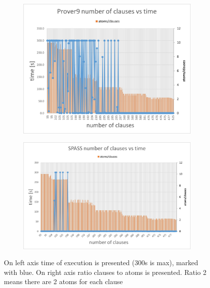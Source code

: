 \begin{figure}[ht]
\centering
  \begin{subfigure}{0.9\textwidth}
\centering
  \includegraphics[width=\textwidth]{logic-formula-generator/dataset_analysis/cnf charts/01 Prover9 number of clauses vs time.jpg}
  \label{pic:benchmark_results}
  \end{subfigure}

  \begin{subfigure}{\textwidth}
\centering
  \includegraphics[width=\textwidth]{logic-formula-generator/dataset_analysis/cnf charts/11 SPASS number of clauses vs time.jpg}
  \end{subfigure}
  \caption{On left axis time of execution is presented (300s is max), marked with blue. On right axis ratio clauses to atoms is presented. Ratio 2 means there are 2 atoms for each clause}
  \label{pic:SPASSProverNumberOfClauses}
\end{figure}

